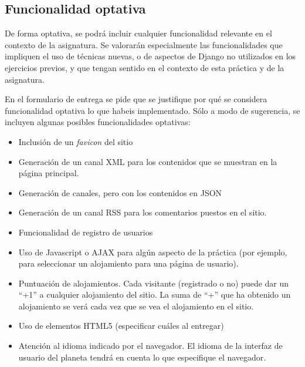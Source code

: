 \subsection{Funcionalidad optativa}

De forma optativa, se podrá incluir cualquier funcionalidad relevante en el contexto de la asignatura. Se valorarán especialmente las funcionalidades que impliquen el uso de técnicas nuevas, o de aspectos de Django no utilizados en los ejercicios previos, y que tengan sentido en el contexto de esta práctica y de la asignatura.

En el formulario de entrega se pide que se justifique por qué se considera funcionalidad optativa lo que habeis implementado. Sólo a modo de sugerencia, se incluyen algunas posibles funcionalidades optativas:

\begin{itemize}
  \item Inclusión de un \emph{favicon} del sitio
  
  \item Generación de un canal XML para los contenidos que se muestran en la página principal.

  \item Generación de canales, pero con los contenidos en JSON

  \item Generación de un canal RSS para los comentarios puestos en el sitio.
  
  \item Funcionalidad de registro de usuarios
  
  \item Uso de Javascript o AJAX para algún aspecto de la práctica (por ejemplo, para seleccionar un alojamiento para una página de usuario).

  \item Puntuación de alojamientos. Cada visitante (registrado o no) puede dar un ``+1'' a cualquier alojamiento del sitio. La suma de ``+'' que ha obtenido un alojamiento se verá cada vez que se vea el alojamiento en el sitio.
  
  \item Uso de elementos HTML5 (especificar cuáles al entregar)

  \item Atención al idioma indicado por el navegador. El idioma de la interfaz de usuario del planeta tendrá en cuenta lo que especifique el navegador.

\end{itemize}


